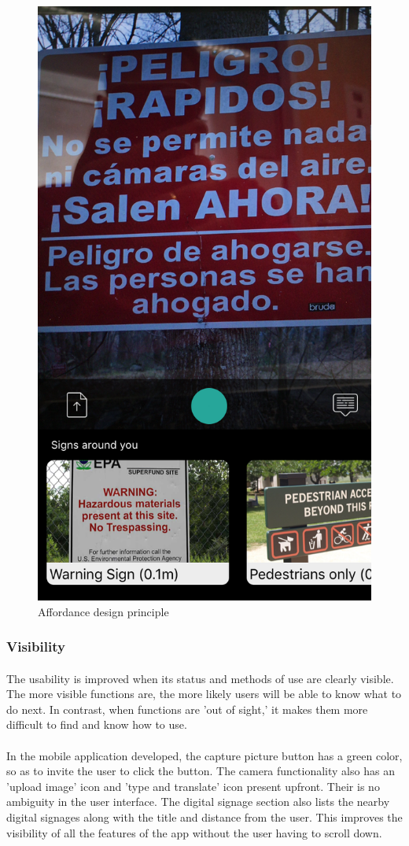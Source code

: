 \documentclass[12pt]{article}
\begin{document}
    
    \begin{figure}[H]
	\centering
	\includegraphics[width=0.5\linewidth]{media/1a.PNG}
	\caption{Affordance design principle}
	\label{fig:affordance}
\end{figure} 

    
    
     \subsubsection{Visibility}
     \paragraph{}The usability is improved when its status and methods of use are clearly visible. The more visible functions are, the more likely users will be able to know what to do next.\cite{norman} In contrast, when functions are 'out of sight,' it makes them more difficult to find and know how to use.
     
         \paragraph{} In the mobile application developed, the capture picture button has a green color, so as to invite the user to click the button. The camera functionality also has an 'upload image' icon and 'type and translate' icon present upfront. Their is no ambiguity in the user interface. The digital signage section also lists the nearby digital signages along with the title and distance from the user. This improves the visibility of all the features of the app without the user having to scroll down. 
     
\end{document}

